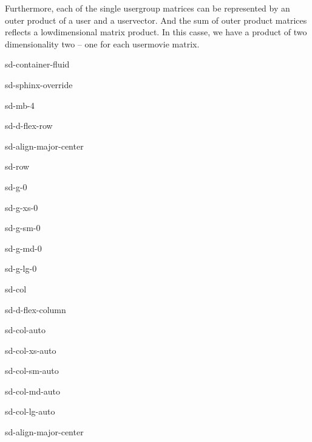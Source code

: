 \documentclass[letterpaper,10pt,english]{jupyterBook}
\begin{document}
Furthermore, each of the single user\sphinxhyphen{}group matrices can be represented by an outer product of a user\sphinxhyphen{} and a user\sphinxhyphen{}vector. And the sum of outer product matrices reflects a low\sphinxhyphen{}dimensional matrix product. In this casse, we have a product of two dimensionality two – one for each user\sphinxhyphen{}movie matrix.

\begin{sphinxuseclass}{sd-container-fluid}
\begin{sphinxuseclass}{sd-sphinx-override}
\begin{sphinxuseclass}{sd-mb-4}
\begin{sphinxuseclass}{sd-d-flex-row}
\begin{sphinxuseclass}{sd-align-major-center}
\begin{sphinxuseclass}{sd-row}
\begin{sphinxuseclass}{sd-g-0}
\begin{sphinxuseclass}{sd-g-xs-0}
\begin{sphinxuseclass}{sd-g-sm-0}
\begin{sphinxuseclass}{sd-g-md-0}
\begin{sphinxuseclass}{sd-g-lg-0}
\begin{sphinxuseclass}{sd-col}
\begin{sphinxuseclass}{sd-d-flex-column}
\begin{sphinxuseclass}{sd-col-auto}
\begin{sphinxuseclass}{sd-col-xs-auto}
\begin{sphinxuseclass}{sd-col-sm-auto}
\begin{sphinxuseclass}{sd-col-md-auto}
\begin{sphinxuseclass}{sd-col-lg-auto}
\begin{sphinxuseclass}{sd-align-major-center}\begin{center}
\end{center}
\end{sphinxuseclass}
\end{sphinxuseclass}
\end{sphinxuseclass}
\end{sphinxuseclass}
\end{sphinxuseclass}
\end{sphinxuseclass}
\end{sphinxuseclass}
\end{sphinxuseclass}
\end{sphinxuseclass}
\end{sphinxuseclass}
\end{sphinxuseclass}
\end{sphinxuseclass}
\end{sphinxuseclass}
\end{sphinxuseclass}
\end{sphinxuseclass}
\end{sphinxuseclass}
\end{sphinxuseclass}
\end{sphinxuseclass}
\end{sphinxuseclass}
\end{document}
